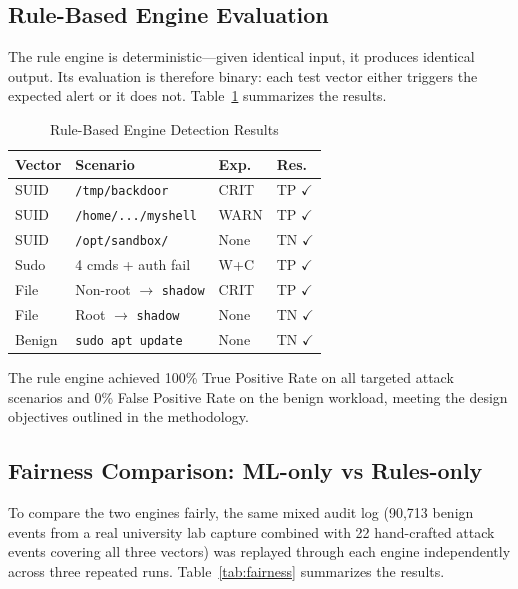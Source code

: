 \documentclass[journal]{./IEEEtran}
\begin{document}
\subsection{Rule-Based Engine Evaluation}

The rule engine is deterministic---given identical input, it produces identical output. Its evaluation is therefore binary: each test vector either triggers the expected alert or it does not. Table~\ref{tab:rules_eval} summarizes the results.

\begin{table}[H]
    \centering
    \footnotesize
    \setlength{\tabcolsep}{3pt}
    \renewcommand{\arraystretch}{1.1}
    \caption{Rule-Based Engine Detection Results}
    \begin{tabular}{|l|p{3cm}|l|l|}
        \hline
        \textbf{Vector} & \textbf{Scenario} & \textbf{Exp.} & \textbf{Res.} \\ \hline
        SUID & \texttt{/tmp/backdoor} & CRIT & TP $\checkmark$ \\ \hline
        SUID & \texttt{/home/.../myshell} & WARN & TP $\checkmark$ \\ \hline
        SUID & \texttt{/opt/sandbox/} & None & TN $\checkmark$ \\ \hline
        Sudo & 4 cmds + auth fail & W+C & TP $\checkmark$ \\ \hline
        File & Non-root $\rightarrow$ \texttt{shadow} & CRIT & TP $\checkmark$ \\ \hline
        File & Root $\rightarrow$ \texttt{shadow} & None & TN $\checkmark$ \\ \hline
        Benign & \texttt{sudo apt update} & None & TN $\checkmark$ \\ \hline
    \end{tabular}
    \label{tab:rules_eval}
\end{table}

The rule engine achieved 100\% True Positive Rate on all targeted attack scenarios and 0\% False Positive Rate on the benign workload, meeting the design objectives outlined in the methodology.

\subsection{Fairness Comparison: ML-only vs Rules-only}

To compare the two engines fairly, the same mixed audit log (90,713 benign events from a real university lab capture combined with 22 hand-crafted attack events covering all three vectors) was replayed through each engine independently across three repeated runs. Table~\ref{tab:fairness} summarizes the results.
\end{document}
